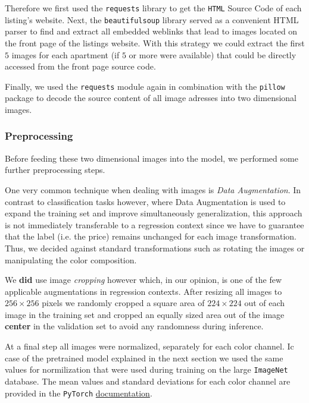 \documentclass[12pt, letterpaper]{article}
\begin{document}
Therefore we first used the \texttt{requests} library to get the \texttt{HTML} Source Code of each listing's website.
Next, the \texttt{beautifulsoup} library served as a convenient HTML parser to find and extract all embedded weblinks that lead to images located on the front page of the listings website.
With this strategy we could extract the first $5$ images for each apartment (if $5$ or more were available) that could be directly accessed from the front page source code.

Finally, we used the \texttt{requests} module again in combination with the \texttt{pillow} package to decode the source content of all image adresses into two dimensional images.


\subsubsection{Preprocessing}

Before feeding these two dimensional images into the model, we performed some further preprocessing steps.

One very common technique when dealing with images is \emph{Data Augmentation}.
In contrast to classification tasks however, where Data Augmentation is used to expand the training set and improve simultaneously generalization, this approach is not immediately transferable to a regression context since we have to guarantee that the label (i.e. the price) remains unchanged for each image transformation.
Thus, we decided against standard transformations such as rotating the images or manipulating the color composition.

We \textbf{did} use image \emph{cropping} however which, in our opinion, is one of the few applicable augmentations in regression contexts.
After resizing all images to $256 \times 256$ pixels we randomly cropped a square area of $224 \times 224$ out of each image in the training set and cropped an equally sized area out of the image \textbf{center} in the validation set to avoid any randomness during inference.

At a final step all images were normalized, separately for each color channel.
Ic case of the pretrained model explained in the next section we used the same values for normilization that were used during training on the large \texttt{ImageNet} database.
The mean values and standard deviations for each color channel are provided in the \texttt{PyTorch} \href{https://pytorch.org/vision/stable/models.html}{documentation}.
\end{document}
